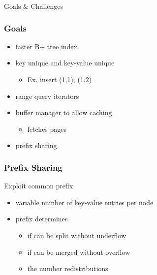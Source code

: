 \documentclass{beamer}
\begin{document}
  \begin{section}{Goals \& Challenges}
    \begin{frame}
      \frametitle{Goals}
        \begin{itemize}
          \item faster B+ tree index
          \pause
          \item key unique and key-value unique
          \begin{itemize}
            \item Ex. insert (1,1), (1,2)
          \end{itemize}
          \pause
          \item range query iterators
          \pause
          \item buffer manager to allow caching
          \begin{itemize}
            \item fetches pages 
          \end{itemize}
          \pause
          \item prefix sharing
        \end{itemize}
    \end{frame}

    \begin{frame}
      \frametitle{Prefix Sharing}
      \begin{block} {Exploit common prefix}
      \hspace*{\fill}
      \pause
      \hspace*{\fill}
      \end{block}
      \pause
      \pause
        \begin{itemize}
            \item variable number of key-value entries per node 
            \pause
            \item prefix determines
            \begin{itemize}
              \item if can be split without underflow
              \pause
              \item if can be merged without overflow
              \pause
              \item the number redistributions
            \end{itemize}
        \end{itemize}    
    \end{frame}


\end{section}
\end{document}
